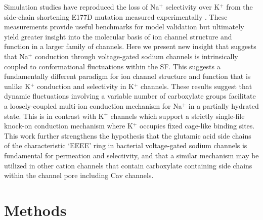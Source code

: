 \begin{refsection}
Simulation studies have reproduced the loss of Na$^+$ selectivity over K$^+$ from the side-chain shortening E177D mutation measured experimentally \cite{FinolUrdaneta:2014bz}. These measurements provide useful benchmarks for model validation but ultimately yield greater insight into the molecular basis of ion channel structure and function in a larger family of channels. Here we present new insight that suggests that Na$^+$ conduction through voltage-gated sodium channels is intrinsically coupled to conformational fluctuations within the SF. This suggests a fundamentally different paradigm for ion channel structure and function that is unlike K$^+$ conduction and selectivity in K$^+$ channels. These results suggest that dynamic fluctuations involving a variable number of carboxylate groups facilitate a loosely-coupled multi-ion conduction mechanism for Na$^+$ in a partially hydrated state. This is in contrast with K$^+$ channels which support a strictly single-file knock-on conduction mechanism where K$^+$ occupies fixed cage-like binding sites. This work further strengthens the hypothesis that the glutamic acid side chains of the characteristic `EEEE' ring in bacterial voltage-gated sodium channels is fundamental for permeation and selectivity, and that a similar mechanism may be utilized in other cation channels that contain carboxylate containing side chains within the channel pore including Cav channels. %

\section{Methods} 


\end{refsection}
